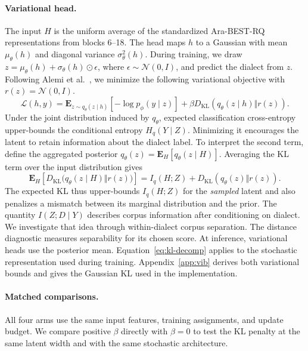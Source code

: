 \documentclass[11pt]{article}
\begin{document}
\paragraph{Variational head.}
The input \(H\) is the uniform average of the standardized Ara-BEST-RQ representations from blocks 6--18. The head maps \(h\) to a Gaussian with mean \(\mu_\theta(h)\) and diagonal variance \(\sigma_\theta^2(h)\). During training, we draw \(z=\mu_\theta(h)+\sigma_\theta(h)\odot\epsilon\), where \(\epsilon\sim\mathcal{N}(0,I)\), and predict the dialect from \(z\). Following Alemi et al.~\cite{alemi}, we minimize the following variational objective with \(r(z)=\mathcal{N}(0,I)\).
\[
  \mathcal{L}(h,y)
  =
  \mathbf{E}_{z\sim q_\theta(z\mid h)}
    [-\log p_\phi(y\mid z)]
  +\beta D_{\mathrm{KL}}\!\left(q_\theta(z\mid h)\Vert r(z)\right).
\]
Under the joint distribution induced by \(q_\theta\), expected classification cross-entropy upper-bounds the conditional entropy \(H_q(Y\mid Z)\). Minimizing it encourages the latent to retain information about the dialect label. To interpret the second term, define the aggregated posterior \(q_\theta(z)=\mathbf{E}_{H}[q_\theta(z\mid H)]\). Averaging the KL term over the input distribution gives
\begin{equation}
\label{eq:kl-decomp}
  \mathbf{E}_{H}\!\left[D_{\mathrm{KL}}
   \bigl(q_\theta(z\mid H)\Vert r(z)\bigr)\right]
  =
  I_q(H;Z)+D_{\mathrm{KL}}\!\left(q_\theta(z)\Vert r(z)\right).
\end{equation}
The expected KL thus upper-bounds \(I_q(H;Z)\) for the \emph{sampled} latent and also penalizes a mismatch between its marginal distribution and the prior. The quantity \(I(Z;D\mid Y)\) describes corpus information after conditioning on dialect. We investigate that idea through within-dialect corpus separation. The distance diagnostic measures separability for its chosen score. At inference, variational heads use the posterior mean. Equation~\ref{eq:kl-decomp} applies to the stochastic representation used during training. Appendix~\ref{app:vib} derives both variational bounds and gives the Gaussian KL used in the implementation.

\paragraph{Matched comparisons.}
All four arms use the same input features, training assignments, and update budget. We compare positive \(\beta\) directly with \(\beta=0\) to test the KL penalty at the same latent width and with the same stochastic architecture.
\end{document}
